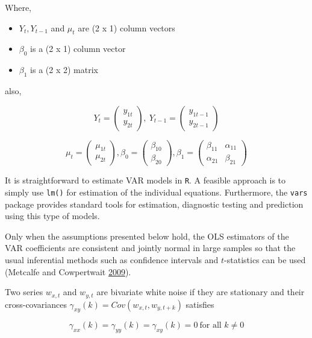 \documentclass[
  12pt,
]{article}
\providecommand{\tightlist}{%
  \setlength{\itemsep}{0pt}\setlength{\parskip}{0pt}}
\begin{document}
Where,

\begin{itemize}
\tightlist
\item
  \(Y_t, Y_{t-1}\) and \(\mu_t\) are (2 x 1) column vectors
\item
  \(\beta_0\) is a (2 x 1) column vector
\item
  \(\beta_1\) is a (2 x 2) matrix
\end{itemize}

also,

\[
Y_t = 
\begin{pmatrix} 
y_{1t} \\
y_{2t}
\end{pmatrix},\ 
Y_{t-1} = 
\begin{pmatrix} 
y_{1t-1} \\
y_{2t-1}
\end{pmatrix}
\]

\[
\mu_t = 
\begin{pmatrix} 
\mu_{1t} \\
\mu_{2t}
\end{pmatrix},
\beta_{0} = 
\begin{pmatrix} 
\beta_{10} \\
\beta_{20}
\end{pmatrix},
\beta_{1} = 
\begin{pmatrix} 
\beta_{11} & \alpha_{11} \\
\alpha_{21} & \beta_{21}
\end{pmatrix}
\]

It is straightforward to estimate VAR models in \texttt{R}. A feasible approach is to simply use \texttt{lm()} for estimation of the individual equations. Furthermore, the \texttt{vars} package provides standard tools for estimation, diagnostic testing and prediction using this type of models.

Only when the assumptions presented below hold, the OLS estimators of the VAR coefficients are consistent and jointly normal in large samples so that the usual inferential methods such as confidence intervals and \(t\)-statistics can be used (Metcalfe and Cowpertwait \protect\hyperlink{ref-metcalfe2009introductory}{2009}).

Two series \(w_{x,t}\) and \(w_{y,t}\) are bivariate white noise if they are stationary and their cross-covariances \(\gamma_{xy}(k) = Cov(w_{x,t}, w_{y, t+k})\) satisfies

\[
\gamma_{xx}(k) = \gamma_{yy}(k) = \gamma_{xy}(k) = 0\ \text{for all } k \neq 0
\]
\end{document}
